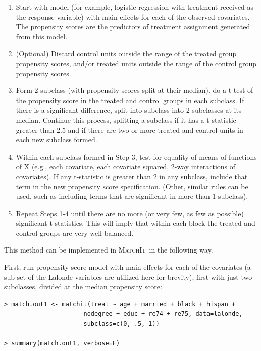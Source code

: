 \documentclass[oneside,letterpaper,titlepage]{article}
\newcommand{\MatchIt}{\textsc{MatchIt}}
\begin{document}
\begin{enumerate}
\item Start with model (for example, logistic regression with treatment received as the response variable) with main
effects for each of the observed covariates.  The propensity scores are the predictors of treatment assignment generated
from this model.  
\item (Optional) Discard control units outside the range of the treated group propensity scores, and/or treated units
outside the range of the control group propensity scores.
\item Form 2 subclass (with propensity scores split at their median), do a t-test of the propensity score in 
the treated and 
control groups in each subclass.  If there is a significant difference, split into subclass into 2 subclasses at its median.  
Continue this process, splitting a subclass if it has
a t-statistic greater than 2.5 and if there are two or more treated and control units in each new subclass formed.
\item Within each subclass formed in Step 3, test for equality of means of functions of X (e.g., each covariate, each
covariate squared,
2-way interactions of covariates).  If any t-statistic is greater than 2 in any subclass, include that term in the new
propensity score specification.  (Other, similar rules can be used, such as including terms that are significant in
more than 1 subclass).
\item Repeat Steps 1-4 until there are no more (or very few, as few as possible) significant t-statistics.  This will
imply that within each block the treated and control groups are very well balanced.
\end{enumerate}

This method can be implemented in \MatchIt\ in the following way.

First, run propensity score model with main effects for each of the covariates
(a sub-set of the Lalonde variables are utilized here for brevity), first
with just two subclasses, divided at the median propensity score:

\begin{verbatim}
> match.out1 <- matchit(treat ~ age + married + black + hispan +
                      nodegree + educ + re74 + re75, data=lalonde,                      
                      subclass=c(0, .5, 1))

> summary(match.out1, verbose=F)
\end{verbatim}
\end{document}
